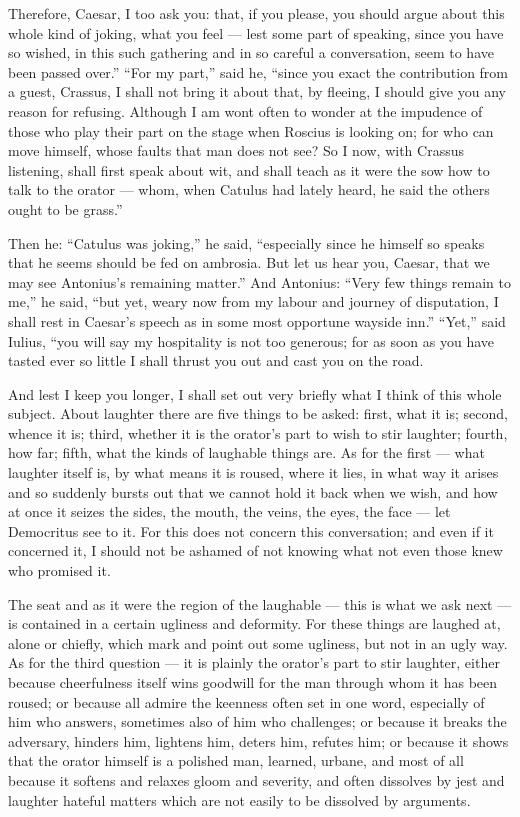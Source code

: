  Therefore, Caesar, I too ask you: that, if you please, you should argue about this whole kind of joking, what you feel — lest some part of speaking, since you have so wished, in this such gathering and in so careful a conversation, seem to have been passed over.'' ``For my part,'' said he, ``since you exact the contribution from a guest, Crassus, I shall not bring it about that, by fleeing, I should give you any reason for refusing. Although I am wont often to wonder at the impudence of those who play their part on the stage when Roscius is looking on; for who can move himself, whose faults that man does not see? So I now, with Crassus listening, shall first speak about wit, and shall teach as it were the sow how to talk to the orator — whom, when Catulus had lately heard, he said the others ought to be grass.''

 Then he: ``Catulus was joking,'' he said, ``especially since he himself so speaks that he seems should be fed on ambrosia. But let us hear you, Caesar, that we may see Antonius's remaining matter.'' And Antonius: ``Very few things remain to me,'' he said, ``but yet, weary now from my labour and journey of disputation, I shall rest in Caesar's speech as in some most opportune wayside inn.'' ``Yet,'' said Iulius, ``you will say my hospitality is not too generous; for as soon as you have tasted ever so little I shall thrust you out and cast you on the road.

 And lest I keep you longer, I shall set out very briefly what I think of this whole subject. About laughter there are five things to be asked: first, what it is; second, whence it is; third, whether it is the orator's part to wish to stir laughter; fourth, how far; fifth, what the kinds of laughable things are. As for the first — what laughter itself is, by what means it is roused, where it lies, in what way it arises and so suddenly bursts out that we cannot hold it back when we wish, and how at once it seizes the sides, the mouth, the veins, the eyes, the face — let Democritus see to it. For this does not concern this conversation; and even if it concerned it, I should not be ashamed of not knowing what not even those knew who promised it.

 The seat and as it were the region of the laughable — this is what we ask next — is contained in a certain ugliness and deformity. For these things are laughed at, alone or chiefly, which mark and point out some ugliness, but not in an ugly way. As for the third question — it is plainly the orator's part to stir laughter, either because cheerfulness itself wins goodwill for the man through whom it has been roused; or because all admire the keenness often set in one word, especially of him who answers, sometimes also of him who challenges; or because it breaks the adversary, hinders him, lightens him, deters him, refutes him; or because it shows that the orator himself is a polished man, learned, urbane, and most of all because it softens and relaxes gloom and severity, and often dissolves by jest and laughter hateful matters which are not easily to be dissolved by arguments.

